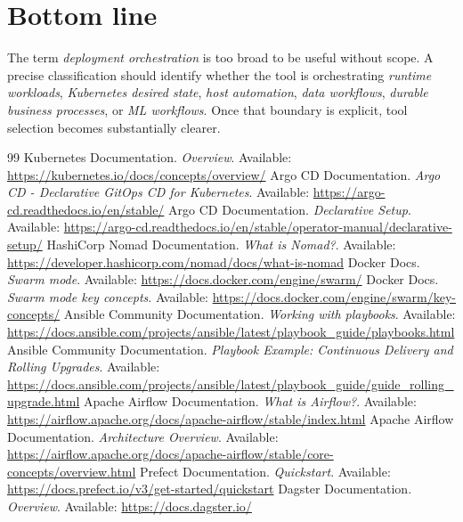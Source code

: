 \documentclass[11pt]{article}
\begin{document}
\section{Bottom line}
The term \emph{deployment orchestration} is too broad to be useful without scope. A precise classification should identify whether the tool is orchestrating \emph{runtime workloads}, \emph{Kubernetes desired state}, \emph{host automation}, \emph{data workflows}, \emph{durable business processes}, or \emph{ML workflows}. Once that boundary is explicit, tool selection becomes substantially clearer.\cite{KubernetesOverview,ArgoCDHome,AnsiblePlaybooks,AirflowHome,TemporalWhatIs,KubeflowIntro}

\begin{thebibliography}{99}
 Kubernetes Documentation. \emph{Overview}. Available: \url{https://kubernetes.io/docs/concepts/overview/}
 Argo CD Documentation. \emph{Argo CD - Declarative GitOps CD for Kubernetes}. Available: \url{https://argo-cd.readthedocs.io/en/stable/}
 Argo CD Documentation. \emph{Declarative Setup}. Available: \url{https://argo-cd.readthedocs.io/en/stable/operator-manual/declarative-setup/}
 HashiCorp Nomad Documentation. \emph{What is Nomad?}. Available: \url{https://developer.hashicorp.com/nomad/docs/what-is-nomad}
 Docker Docs. \emph{Swarm mode}. Available: \url{https://docs.docker.com/engine/swarm/}
 Docker Docs. \emph{Swarm mode key concepts}. Available: \url{https://docs.docker.com/engine/swarm/key-concepts/}
 Ansible Community Documentation. \emph{Working with playbooks}. Available: \url{https://docs.ansible.com/projects/ansible/latest/playbook_guide/playbooks.html}
 Ansible Community Documentation. \emph{Playbook Example: Continuous Delivery and Rolling Upgrades}. Available: \url{https://docs.ansible.com/projects/ansible/latest/playbook_guide/guide_rolling_upgrade.html}
 Apache Airflow Documentation. \emph{What is Airflow?}. Available: \url{https://airflow.apache.org/docs/apache-airflow/stable/index.html}
 Apache Airflow Documentation. \emph{Architecture Overview}. Available: \url{https://airflow.apache.org/docs/apache-airflow/stable/core-concepts/overview.html}
 Prefect Documentation. \emph{Quickstart}. Available: \url{https://docs.prefect.io/v3/get-started/quickstart}
 Dagster Documentation. \emph{Overview}. Available: \url{https://docs.dagster.io/}

\end{thebibliography}
\end{document}
